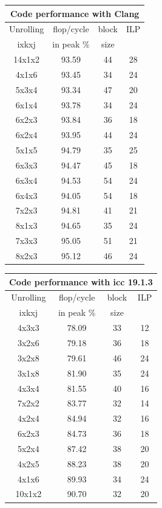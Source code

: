 \documentclass{article}
\begin{document}
\begin{figure}[h!]
{    \scriptsize
    \begin{tabular}{|c|c|c|c|}
      \hline
      \multicolumn{4}{|c|}{Code performance with Clang} \\
      \hline
      Unrolling & flop/cycle & block  & ILP\\
      ixkxj& in peak \% & size & \\
      \hline
14x1x2 & 93.59 & 44 & 28 \\
4x1x6 & 93.45 & 34 & 24 \\
5x3x4 & 93.34 & 47 & 20 \\
6x1x4 & 93.78 & 34 & 24 \\
6x2x3 & 93.84 & 36 & 18 \\
6x2x4 & 93.95 & 44 & 24 \\
5x1x5 & 94.79 & 35 & 25 \\
6x3x3 & 94.47 & 45 & 18 \\
6x3x4 & 94.53 & 54 & 24 \\
6x4x3 & 94.05 & 54 & 18 \\
7x2x3 & 94.81 & 41 & 21 \\
8x1x3 & 94.65 & 35 & 24 \\
7x3x3 & 95.05 & 51 & 21 \\
8x2x3 & 95.12 & 46 & 24 \\
\hline
\end{tabular}
    \begin{tabular}{|c|c|c|c|}
      \hline
      \multicolumn{4}{|c|}{Code performance with icc 19.1.3} \\
      \hline
      Unrolling & flop/cycle & block  & ILP\\
      ixkxj& in peak \% & size & \\
      \hline
4x3x3 & 78.09 & 33 & 12 \\
3x2x6 & 79.18 & 36 & 18 \\
3x2x8 & 79.61 & 46 & 24 \\
3x1x8 & 81.90 & 35 & 24 \\
4x3x4 & 81.55 & 40 & 16 \\
7x2x2 & 83.77 & 32 & 14 \\
4x2x4 & 84.94 & 32 & 16 \\
6x2x3 & 84.73 & 36 & 18 \\
5x2x4 & 87.42 & 38 & 20 \\
4x2x5 & 88.23 & 38 & 20 \\
4x1x6 & 89.93 & 34 & 24 \\
10x1x2 & 90.70 & 32 & 20 \\

\end{tabular}}
\end{figure}
\end{document}
